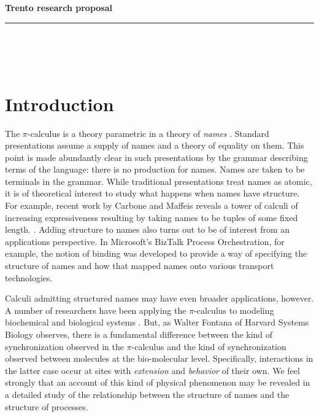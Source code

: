 \documentclass[]{amsart}
\theoremstyle{definition}
\theoremstyle{remark}
\numberwithin{equation}{subsection}
\newcommand{\pic}{$\pi$-calculus}
\newcommand{\paperversion}{Draft Version 0.1 - June 30, 2004}
\newenvironment{toc}
{
\begin{list}{}{
   \setlength{\leftmargin}{0.4in}
   \setlength{\rightmargin}{0.6in}
   \setlength{\parskip}{0pt}
 } \item }
{\end{list}}
\begin{document}
\noindent
{\large \textbf{
Trento research proposal}}\\
\rule{6.25in}{0.75pt}\\\\\\

\maketitle




\section{Introduction}

The {\pic} is a theory parametric in a theory of \textit{names}
\cite{milner91polyadicpi}. Standard presentations assume a supply of
names and a theory of equality on them. This point is made abundantly
clear in such presentations by the grammar describing terms of the
language: there is no production for names. Names are taken to be
terminals in the grammar. While traditional presentations treat names
as atomic, it is of theoretical interest to study what happens when
names have structure. For example, recent work by Carbone and Maffeis
reveals a tower of calculi of increasing expressiveness resulting by
taking names to be tuples of some fixed
length. \cite{polysync}. Adding structure to names also turns out to
be of interest from an applications perspective. In Microsoft's
BizTalk Process Orchestration, for example, the notion of binding was
developed to provide a way of specifying the structure of names and
how that mapped names onto various transport technologies.

Calculi admitting structured names may have even broader applications,
however. A number of researchers have been applying the {\pic} to
modeling biochemical and biological systems
\cite{Regevbiomolecularprocesses}. But, as Walter Fontana of Harvard
Systems Biology observes, there is a fundamental difference between
the kind of synchronization observed in the {\pic} and the kind of
synchronization observed between molecules at the bio-molecular
level. Specifically, interactions in the latter case occur at sites
with \emph{extension} and \emph{behavior} of their own. We feel
strongly that an account of this kind of physical phenomenon may be
revealed in a detailed study of the relationship between the structure
of names and the structure of processes.
\end{document}
